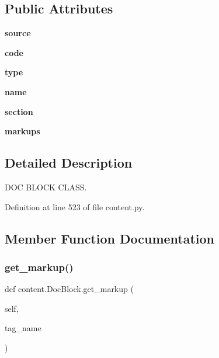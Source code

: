 \subsection*{Public Attributes}
\begin{DoxyCompactItemize}
\item 
\mbox{\label{classcontent_1_1_doc_block_a022cea4f2eebe4a3e76e1c8063999e79}} 
{\bfseries source}
\item 
\mbox{\label{classcontent_1_1_doc_block_a5dd8d45ccdac1032c4d0a3fbc60d18c9}} 
{\bfseries code}
\item 
\mbox{\label{classcontent_1_1_doc_block_a285667031a7d794a8ecb06e32da5e4a8}} 
{\bfseries type}
\item 
\mbox{\label{classcontent_1_1_doc_block_a18bfcd6e4ba7f217c7a5262ba831be49}} 
{\bfseries name}
\item 
\mbox{\label{classcontent_1_1_doc_block_a8433d3046a288bfa6916e2e0e1ad040e}} 
{\bfseries section}
\item 
\mbox{\label{classcontent_1_1_doc_block_ae7571470811e61f8b983d44b4e09083d}} 
{\bfseries markups}
\end{DoxyCompactItemize}


\subsection{Detailed Description}
D\+OC B\+L\+O\+CK C\+L\+A\+SS. 

Definition at line 523 of file content.\+py.



\subsection{Member Function Documentation}
\mbox{\label{classcontent_1_1_doc_block_a23ba3a31d49b8c270fc1e4fc37be6957}} 
\subsubsection{\texorpdfstring{get\+\_\+markup()}{get\_markup()}}
{\footnotesize\ttfamily def content.\+Doc\+Block.\+get\+\_\+markup (\begin{DoxyParamCaption}\item[{}]{self,  }\item[{}]{tag\+\_\+name }\end{DoxyParamCaption})}

